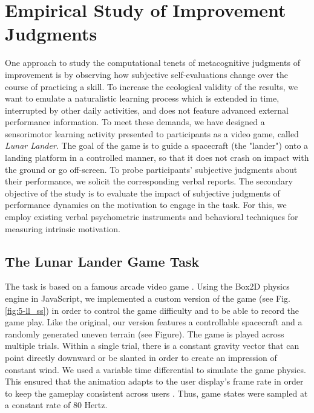 \section{Empirical Study of Improvement Judgments}
One approach to study the computational tenets of metacognitive judgments of improvement is by observing how subjective self-evaluations change over the course of practicing a skill. To increase the ecological validity of the results, we want to emulate a naturalistic learning process which is extended in time, interrupted by other daily activities, and does not feature advanced external performance information. To meet these demands, we have designed a sensorimotor learning activity presented to participants as a video game, called \emph{Lunar Lander}. The goal of the game is to guide a spacecraft (the "lander") onto a landing platform in a controlled manner, so that it does not crash on impact with the ground or go off-screen. To probe participants' subjective judgments about their performance, we solicit the corresponding verbal reports. The secondary objective of the study is to evaluate the impact of subjective judgments of performance dynamics on the motivation to engage in the task. For this, we employ existing verbal psychometric instruments and behavioral techniques for measuring intrinsic motivation.

\subsection{The Lunar Lander Game Task}

The task is based on a famous arcade video game \parencite{LunarLander19792021}. Using the Box2D physics engine in JavaScript, we implemented a custom version of the game (see Fig. \ref{fig:5-ll_ss}) in order to control the game difficulty and to be able to record the game play. Like the original, our version features a controllable spacecraft and a randomly generated uneven terrain (see Figure). The game is played across multiple trials. Within a single trial, there is a constant gravity vector that can point directly downward or be slanted in order to create an impression of constant wind. We used a variable time differential to simulate the game physics. This ensured that the animation adapts to the user display's frame rate in order to keep the gameplay consistent across users \parencite{fiedler_fix_2004}. Thus, game states were sampled at a constant rate of 80 Hertz.

